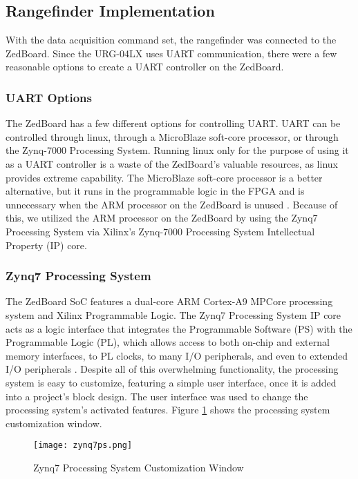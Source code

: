 \subsection{Rangefinder Implementation}
With the data acquisition command set, the rangefinder was connected to the ZedBoard. Since the URG-04LX uses UART communication, there were a few reasonable options to create a UART controller on the ZedBoard.

\subsubsection{UART Options}
The ZedBoard has a few different options for controlling UART. UART can be controlled through linux, through a MicroBlaze soft-core processor, or through the Zynq-7000 Processing System. Running linux only for the purpose of using it as a UART controller is a waste of the ZedBoard's valuable resources, as linux provides extreme capability. The MicroBlaze soft-core processor is a better alternative, but it runs in the programmable logic in the FPGA and is unnecessary when the ARM processor on the ZedBoard is unused \cite{microblaze}. Because of this, we utilized the ARM processor on the ZedBoard by using the Zynq7 Processing System via Xilinx's Zynq-7000 Processing System Intellectual Property (IP) core.

\subsubsection{Zynq7 Processing System}
\label{zynq7processingsystem}
The ZedBoard SoC features a dual-core ARM Cortex-A9 MPCore processing system and Xilinx Programmable Logic. The Zynq7 Processing System IP core acts as a logic interface that integrates the Programmable Software (PS) with the Programmable Logic (PL), which allows access to both on-chip and external memory interfaces, to PL clocks, to many I/O peripherals, and even to extended I/O peripherals \cite{zynq7ps}. Despite all of this overwhelming functionality, the processing system is easy to customize, featuring a simple user interface, once it is added into a project's block design. The user interface was used to change the processing system's activated features. Figure \ref{zynq7ps_pic} shows the processing system customization window.

\begin{figure}[H]
	\centerline{\texttt{[image: zynq7ps.png]}}
	\caption{Zynq7 Processing System Customization Window \cite{zynq7ps}}
	\label{zynq7ps_pic}
\end{figure}

